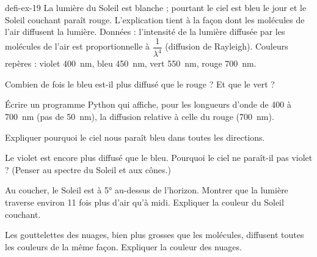 \begin{blocEdition}{defi-ex-19}
La lumière du Soleil est blanche ; pourtant le ciel est bleu le jour et le Soleil couchant paraît rouge. L'explication tient à la façon
dont les molécules de l'air diffusent la lumière.
Données : l'intensité de la lumière diffusée par les molécules de l'air est proportionnelle à $\dfrac{1}{\lambda^4}$ (diffusion de Rayleigh). Couleurs
repères : violet \qty{400}{nm}, bleu \qty{450}{nm}, vert \qty{550}{nm}, rouge \qty{700}{nm}.
\begin{questions}
\item Combien de fois le bleu est-il plus diffusé que le rouge ? Et que le vert ?
\item Écrire un programme Python qui affiche, pour les longueurs d'onde de 400 à \qty{700}{nm} (pas de \qty{50}{nm}), la diffusion relative à celle du rouge
(\qty{700}{nm}).
\item Expliquer pourquoi le ciel nous paraît bleu dans toutes les directions.
\item Le violet est encore plus diffusé que le bleu. Pourquoi le ciel ne paraît-il pas violet ? (Penser au spectre du Soleil et aux cônes.)
\item Au coucher, le Soleil est à \ang{5} au-dessus de l'horizon. Montrer que la lumière traverse environ 11 fois plus d'air qu'à midi. Expliquer
la couleur du Soleil couchant.
\item Les gouttelettes des nuages, bien plus grosses que les molécules, diffusent toutes les couleurs de la même façon. Expliquer la
couleur des nuages.
\end{questions}
\end{blocEdition}

